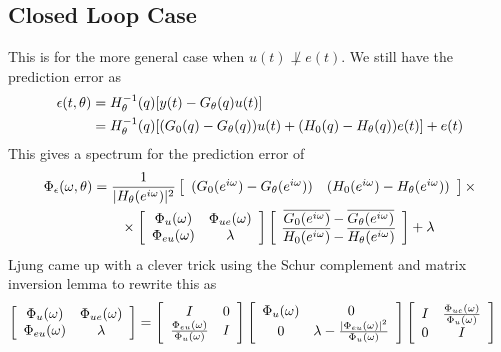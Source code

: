 \subsection{Closed Loop Case}
This is for the more general case when $u(t)\not\perp e(t)$. We still have the prediction error as
\begin{align*}
\epsilon(t,\theta) &= H_\theta^{-1}(q)[y(t)-G_\theta(q) u(t)] \\
&= H_\theta^{-1}(q)[(G_0(q)-G_\theta(q))u(t)+(H_0(q)-H_\theta(q))e(t)]+e(t)
\end{align*}
This gives a spectrum for the prediction error of
\begin{align*}
\Phi_\epsilon(\omega,\theta) &= \frac{1}{|H_\theta(e^{i\omega})|^2}
\left[\begin{array}{c c} (G_0(e^{i\omega})-G_\theta(e^{i\omega})) & (H_0(e^{i\omega})-H_\theta(e^{i\omega})) \end{array}\right] \times \\
&\qquad\times \left[\begin{array}{c c} \Phi_u(\omega) & \Phi_{ue}(\omega) \\ \Phi_{eu}(\omega) & \lambda \end{array}\right]
\left[\begin{array}{c} \overline{G_0(e^{i\omega})}-\overline{G_\theta(e^{i\omega})} \\ \overline{H_0(e^{i\omega})}-\overline{H_\theta(e^{i\omega})} \end{array}\right] + \lambda
\end{align*}
Ljung came up with a clever trick using the Schur complement and matrix inversion lemma to rewrite this as
\begin{align*}
\left[\begin{array}{c c} \Phi_u(\omega) & \Phi_{ue}(\omega) \\ \Phi_{eu}(\omega) & \lambda \end{array}\right] &=
\left[\begin{array}{c c} I & 0 \\ \frac{\Phi_{eu}(\omega)}{\Phi_u(\omega)} & I \end{array}\right]
\left[\begin{array}{c c} \Phi_u(\omega) & 0 \\ 0 & \lambda-\frac{|\Phi_{eu}(\omega)|^2}{\Phi_u(\omega)} \end{array}\right]
\left[\begin{array}{c c} I & \frac{\Phi_{ue}(\omega)}{\Phi_u(\omega)} \\ 0 & I \end{array}\right]
\end{align*}

